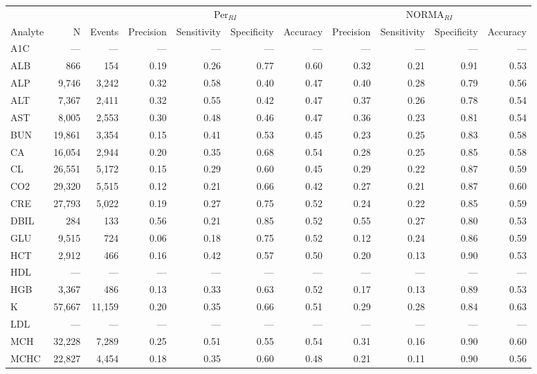 \begin{table}[ht]
\centering
\footnotesize
\begin{tabular}{lrrrrrrrrrr}
\toprule
 & &  & \multicolumn{4}{c}{Per$_{RI}$} & \multicolumn{4}{c}{NORMA$_{RI}$} \\
\cmidrule(lr){4-7} \cmidrule(lr){8-11}
Analyte & N & Events & Precision & Sensitivity & Specificity & Accuracy & Precision & Sensitivity & Specificity & Accuracy \\
\midrule
A1C & --- & --- & --- & --- & --- & --- & --- & --- & --- & --- \\
ALB & 866 & 154 & 0.19 & 0.26 & 0.77 & 0.60 & 0.32 & 0.21 & 0.91 & 0.53 \\
ALP & 9,746 & 3,242 & 0.32 & 0.58 & 0.40 & 0.47 & 0.40 & 0.28 & 0.79 & 0.56 \\
ALT & 7,367 & 2,411 & 0.32 & 0.55 & 0.42 & 0.47 & 0.37 & 0.26 & 0.78 & 0.54 \\
AST & 8,005 & 2,553 & 0.30 & 0.48 & 0.46 & 0.47 & 0.36 & 0.23 & 0.81 & 0.54 \\
BUN & 19,861 & 3,354 & 0.15 & 0.41 & 0.53 & 0.45 & 0.23 & 0.25 & 0.83 & 0.58 \\
CA & 16,054 & 2,944 & 0.20 & 0.35 & 0.68 & 0.54 & 0.28 & 0.25 & 0.85 & 0.58 \\
CL & 26,551 & 5,172 & 0.15 & 0.29 & 0.60 & 0.45 & 0.29 & 0.22 & 0.87 & 0.59 \\
CO2 & 29,320 & 5,515 & 0.12 & 0.21 & 0.66 & 0.42 & 0.27 & 0.21 & 0.87 & 0.60 \\
CRE & 27,793 & 5,022 & 0.19 & 0.27 & 0.75 & 0.52 & 0.24 & 0.22 & 0.85 & 0.59 \\
DBIL & 284 & 133 & 0.56 & 0.21 & 0.85 & 0.52 & 0.55 & 0.27 & 0.80 & 0.53 \\
GLU & 9,515 & 724 & 0.06 & 0.18 & 0.75 & 0.52 & 0.12 & 0.24 & 0.86 & 0.59 \\
HCT & 2,912 & 466 & 0.16 & 0.42 & 0.57 & 0.50 & 0.20 & 0.13 & 0.90 & 0.53 \\
HDL & --- & --- & --- & --- & --- & --- & --- & --- & --- & --- \\
HGB & 3,367 & 486 & 0.13 & 0.33 & 0.63 & 0.52 & 0.17 & 0.13 & 0.89 & 0.53 \\
K & 57,667 & 11,159 & 0.20 & 0.35 & 0.66 & 0.51 & 0.29 & 0.28 & 0.84 & 0.63 \\
LDL & --- & --- & --- & --- & --- & --- & --- & --- & --- & --- \\
MCH & 32,228 & 7,289 & 0.25 & 0.51 & 0.55 & 0.54 & 0.31 & 0.16 & 0.90 & 0.60 \\
MCHC & 22,827 & 4,454 & 0.18 & 0.35 & 0.60 & 0.48 & 0.21 & 0.11 & 0.90 & 0.56 \\

\end{tabular}
\end{table}
